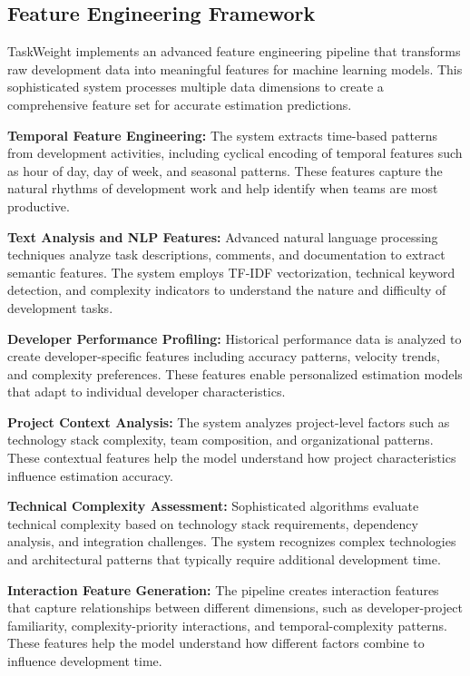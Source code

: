 \documentclass[12pt,a4paper]{article}
\begin{document}
\subsection{Feature Engineering Framework}

TaskWeight implements an advanced feature engineering pipeline that transforms raw development data into meaningful features for machine learning models. This sophisticated system processes multiple data dimensions to create a comprehensive feature set for accurate estimation predictions.

\textbf{Temporal Feature Engineering:} The system extracts time-based patterns from development activities, including cyclical encoding of temporal features such as hour of day, day of week, and seasonal patterns. These features capture the natural rhythms of development work and help identify when teams are most productive.

\textbf{Text Analysis and NLP Features:} Advanced natural language processing techniques analyze task descriptions, comments, and documentation to extract semantic features. The system employs TF-IDF vectorization, technical keyword detection, and complexity indicators to understand the nature and difficulty of development tasks.

\textbf{Developer Performance Profiling:} Historical performance data is analyzed to create developer-specific features including accuracy patterns, velocity trends, and complexity preferences. These features enable personalized estimation models that adapt to individual developer characteristics.

\textbf{Project Context Analysis:} The system analyzes project-level factors such as technology stack complexity, team composition, and organizational patterns. These contextual features help the model understand how project characteristics influence estimation accuracy.

\textbf{Technical Complexity Assessment:} Sophisticated algorithms evaluate technical complexity based on technology stack requirements, dependency analysis, and integration challenges. The system recognizes complex technologies and architectural patterns that typically require additional development time.

\textbf{Interaction Feature Generation:} The pipeline creates interaction features that capture relationships between different dimensions, such as developer-project familiarity, complexity-priority interactions, and temporal-complexity patterns. These features help the model understand how different factors combine to influence development time.
\end{document}
